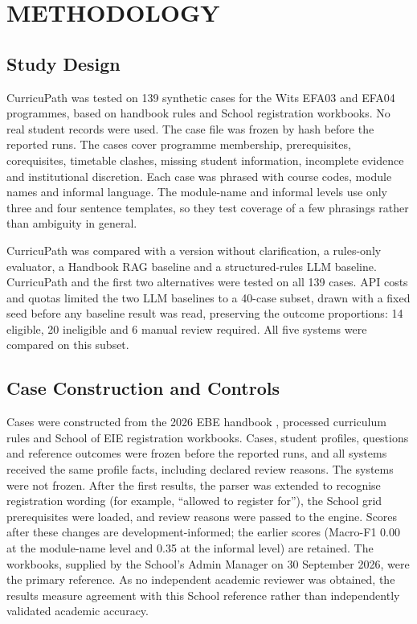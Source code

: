 \section{METHODOLOGY}

\subsection{Study Design}
CurricuPath was tested on 139 synthetic cases for the Wits EFA03 and EFA04
programmes, based on handbook rules and School registration workbooks. No
real student records were used. The case file was frozen by hash before the
reported runs. The cases cover programme membership, prerequisites,
corequisites, timetable clashes, missing student information, incomplete
evidence and institutional discretion. Each case was phrased with course
codes, module names and informal language. The module-name and informal
levels use only three and four sentence templates, so they test coverage of
a few phrasings rather than ambiguity in general.

CurricuPath was compared with a version without clarification, a rules-only
evaluator, a Handbook RAG baseline and a structured-rules LLM baseline.
CurricuPath and the first two alternatives were tested on all 139 cases.
API costs and quotas limited the two LLM baselines to a 40-case subset,
drawn with a fixed seed before any baseline result was read, preserving the
outcome proportions: 14 eligible, 20 ineligible and 6 manual review
required. All five systems were compared on this subset.

\subsection{Case Construction and Controls}
Cases were constructed from the 2026 EBE handbook \cite{wits2026ebe},
processed curriculum rules and School of EIE registration workbooks. Cases,
student profiles, questions and reference outcomes were frozen before the
reported runs, and all systems received the same profile facts, including
declared review reasons. The systems were not frozen. After the first
results, the parser was extended to recognise registration wording (for
example, ``allowed to register for''), the School grid prerequisites were
loaded, and review reasons were passed to the engine. Scores after these
changes are development-informed; the earlier scores (Macro-F1 0.00 at the
module-name level and 0.35 at the informal level) are retained. The
workbooks, supplied by the School's Admin Manager on 30 September 2026, were
the primary reference. As no independent academic reviewer was obtained,
the results measure agreement with this School reference rather than
independently validated academic accuracy.

